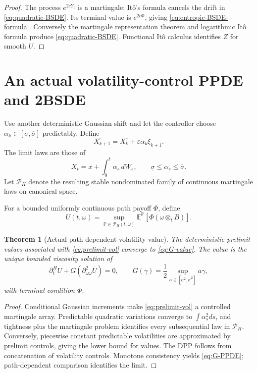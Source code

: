 \documentclass[11pt,reqno]{amsart}
\newtheorem{theorem}{Theorem}[section]
\theoremstyle{definition}
\theoremstyle{remark}
\newcommand{\E}{\mathbb E}
\newcommand{\Pp}{\mathbb P}
\newcommand{\cP}{\mathcal P}
\begin{document}
\begin{proof}
The process $e^{2cY_t}$ is a martingale: It\^o's formula cancels the drift in
\eqref{eq:quadratic-BSDE}.  Its terminal value is $e^{2c\Phi}$, giving
\eqref{eq:entropic-BSDE-formula}.  Conversely the martingale representation
theorem and logarithmic It\^o formula produce \eqref{eq:quadratic-BSDE}.
Functional It\^o calculus identifies $Z$ for smooth $U$.
\end{proof}

\section{An actual volatility-control PPDE and 2BSDE}\label{sec:2bsde-actual}

Use another deterministic Gaussian shift and let the controller choose
$\alpha_k\in[\underline\sigma,\overline\sigma]$ predictably.  Define
\begin{equation}\label{eq:prelimit-vol}
 X_{k+1}^\varepsilon=X_k^\varepsilon+
 \varepsilon\alpha_k\xi_{k+1}.
\end{equation}
The limit laws are those of
\begin{equation}\label{eq:vol-SDE}
 X_t=x+\int_0^t\alpha_s\,dW_s,
 \qquad
 \underline\sigma\le\alpha_s\le\overline\sigma.
\end{equation}
Let $\cP_H$ denote the resulting stable nondominated family of continuous
martingale laws on canonical space.

For a bounded uniformly continuous path payoff $\Phi$, define
\begin{equation}\label{eq:G-value}
 U(t,\omega)=\sup_{\Pp\in\cP_H(t,\omega)}
 \E^{\Pp}[\Phi(\omega\otimes_tB)].
\end{equation}

\begin{theorem}[Actual path-dependent volatility value]\label{thm:G-PPDE}
The deterministic prelimit values associated with \eqref{eq:prelimit-vol}
converge to \eqref{eq:G-value}.  The value is the unique bounded viscosity
solution of
\begin{equation}\label{eq:G-PPDE}
 \partial_t^HU+G(\partial_{\omega\omega}^2U)=0,
 \qquad
 G(\gamma)=\frac12\sup_{a\in
 [\underline\sigma^2,\overline\sigma^2]}a\gamma,
\end{equation}
with terminal condition $\Phi$.
\end{theorem}

\begin{proof}
Conditional Gaussian increments make \eqref{eq:prelimit-vol} a controlled
martingale array.  Predictable quadratic variations converge to
$\int\alpha_s^2ds$, and tightness plus the martingale problem identifies every
subsequential law in $\cP_H$.  Conversely, piecewise constant predictable
volatilities are approximated by prelimit controls, giving the lower bound for
values.  The DPP follows from concatenation of volatility controls.  Monotone
consistency yields \eqref{eq:G-PPDE}; path-dependent comparison identifies the
limit.
\end{proof}
\end{document}
